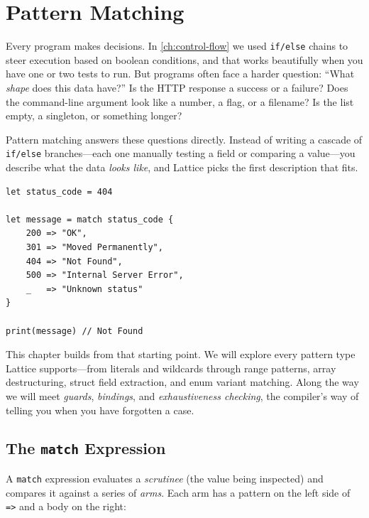 \chapter{Pattern Matching}\label{ch:pattern-matching}


Every program makes decisions. In \cref{ch:control-flow} we used \lstinline|if/else| chains to steer execution based on boolean conditions, and that works beautifully when you have one or two tests to run. But programs often face a harder question: ``What \emph{shape} does this data have?'' Is the HTTP response a success or a failure? Does the command-line argument look like a number, a flag, or a filename? Is the list empty, a singleton, or something longer?

Pattern matching answers these questions directly. Instead of writing a cascade of \lstinline|if/else| branches---each one manually testing a field or comparing a value---you describe what the data \emph{looks like}, and Lattice picks the first description that fits.

\begin{lstlisting}[language=Lattice, caption={A first taste of match}]
let status_code = 404

let message = match status_code {
    200 => "OK",
    301 => "Moved Permanently",
    404 => "Not Found",
    500 => "Internal Server Error",
    _   => "Unknown status"
}

print(message) // Not Found
\end{lstlisting}

This chapter builds from that starting point. We will explore every pattern type Lattice supports---from literals and wildcards through range patterns, array destructuring, struct field extraction, and enum variant matching. Along the way we will meet \emph{guards}, \emph{bindings}, and \emph{exhaustiveness checking}, the compiler's way of telling you when you have forgotten a case.

\section{The \texttt{match} Expression}\label{sec:match-expression}

A \lstinline|match| expression evaluates a \emph{scrutinee} (the value being inspected) and compares it against a series of \emph{arms}. Each arm has a pattern on the left side of \lstinline|=>| and a body on the right:

